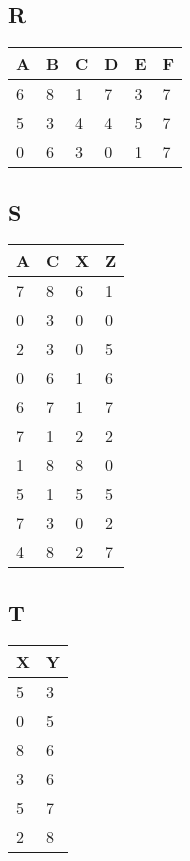 \documentclass{bschlangaul-aufgabe}
\begin{document}
\begin{minipage}[t]{5cm}
\subsection*{R}
\begin{tabular}{llllll}
A & B & C & D & E & F \\\hline
6 & 8 & 1 & 7 & 3 & 7 \\
5 & 3 & 4 & 4 & 5 & 7 \\
0 & 6 & 3 & 0 & 1 & 7
\end{tabular}
\end{minipage}
%
\begin{minipage}[t]{3.8cm}
\subsection*{S}
\begin{tabular}{llll}
A & C & X & Z \\\hline
7 & 8 & 6 & 1 \\
0 & 3 & 0 & 0 \\
2 & 3 & 0 & 5 \\
0 & 6 & 1 & 6 \\
6 & 7 & 1 & 7 \\
7 & 1 & 2 & 2 \\
1 & 8 & 8 & 0 \\
5 & 1 & 5 & 5 \\
7 & 3 & 0 & 2 \\
4 & 8 & 2 & 7 \\
\end{tabular}
\end{minipage}
%
\begin{minipage}[t]{2cm}
\subsection*{T}
\begin{tabular}{ll}
X & Y \\\hline
5 & 3 \\
0 & 5 \\
8 & 6 \\
3 & 6 \\
5 & 7 \\
2 & 8 \\
\end{tabular}
\end{minipage}
\end{document}
